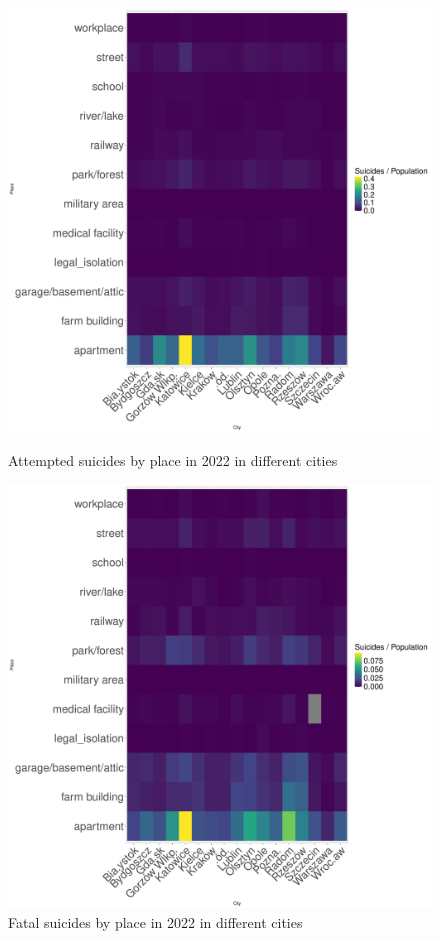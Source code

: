 \documentclass{article}
\begin{document}
\begin{figure}[H]
    \centering
    \begin{minipage}{0.45\textwidth}
        \includegraphics[width=\textwidth]{imgs/place_city_op-att-2022.pdf}
        \caption{Attempted suicides by place  in 2022 in different cities}
	\label{fig:place_city_op-att-2022}
    \end{minipage}
    \hfill
    \begin{minipage}{0.45\textwidth}
        \includegraphics[width=\textwidth]{imgs/place_city_op-fat-2022.pdf}
        \caption{Fatal suicides by place  in 2022 in different cities}
	\label{fig:place_city_op-fat-2022}
    \end{minipage}
\end{figure}
\end{document}
